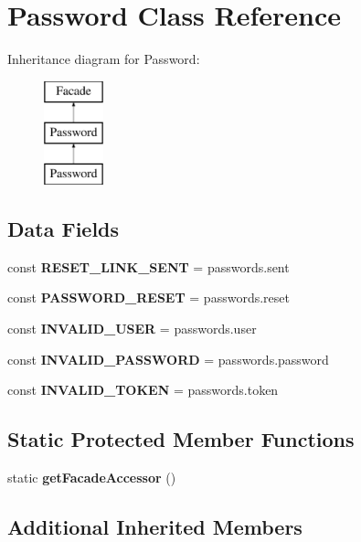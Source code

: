\section{Password Class Reference}
\label{class_illuminate_1_1_support_1_1_facades_1_1_password}
Inheritance diagram for Password\+:\begin{figure}[H]
\begin{center}
\leavevmode
\includegraphics[height=3.000000cm]{class_illuminate_1_1_support_1_1_facades_1_1_password}
\end{center}
\end{figure}
\subsection*{Data Fields}
\begin{DoxyCompactItemize}
\item 
const {\bf R\+E\+S\+E\+T\+\_\+\+L\+I\+N\+K\+\_\+\+S\+E\+N\+T} = \textquotesingle{}passwords.\+sent\textquotesingle{}
\item 
const {\bf P\+A\+S\+S\+W\+O\+R\+D\+\_\+\+R\+E\+S\+E\+T} = \textquotesingle{}passwords.\+reset\textquotesingle{}
\item 
const {\bf I\+N\+V\+A\+L\+I\+D\+\_\+\+U\+S\+E\+R} = \textquotesingle{}passwords.\+user\textquotesingle{}
\item 
const {\bf I\+N\+V\+A\+L\+I\+D\+\_\+\+P\+A\+S\+S\+W\+O\+R\+D} = \textquotesingle{}passwords.\+password\textquotesingle{}
\item 
const {\bf I\+N\+V\+A\+L\+I\+D\+\_\+\+T\+O\+K\+E\+N} = \textquotesingle{}passwords.\+token\textquotesingle{}
\end{DoxyCompactItemize}
\subsection*{Static Protected Member Functions}
\begin{DoxyCompactItemize}
\item 
static {\bf get\+Facade\+Accessor} ()
\end{DoxyCompactItemize}
\subsection*{Additional Inherited Members}


